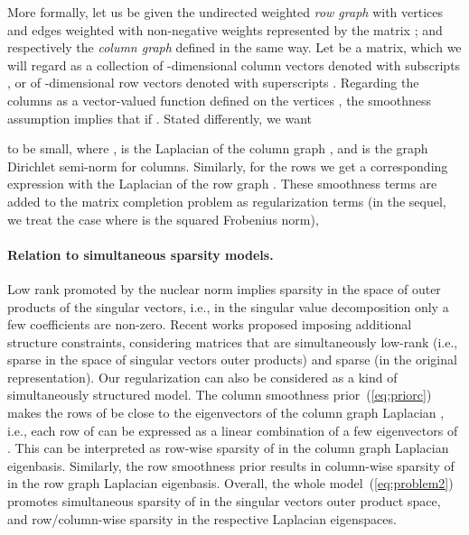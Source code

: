 \documentclass{article}
\begin{document}
More formally, let us be given the undirected weighted {\em row graph}  with vertices  and edges  weighted with non-negative weights represented by the   matrix ; and respectively the {\em column graph}  defined in the same way.  Let  be a matrix, which we will regard as a collection of -dimensional column vectors denoted with subscripts , or of -dimensional row vectors denoted with superscripts . Regarding the columns  as a vector-valued function defined on the vertices , the smoothness assumption implies that  if . Stated differently, we want 
\vspace{-0.15cm}

\vspace{-0.07cm}to be small, where ,  is the Laplacian of the column graph , and  is the graph Dirichlet semi-norm for columns. Similarly, for the rows we get a corresponding expression  with the Laplacian  of the row graph . These smoothness terms are added to the matrix completion problem as regularization terms (in the sequel, we treat the case where  is the squared Frobenius norm), 
\vspace{-0.07cm}

\vspace{-0.55cm}
\paragraph{Relation to simultaneous sparsity models.}
Low rank promoted by the nuclear norm implies sparsity in the space of outer products of the singular vectors, i.e., in the singular value decomposition  only a few coefficients  are non-zero. Recent works \cite{oymak2012simultaneously} proposed imposing additional structure constraints, considering matrices that are simultaneously low-rank (i.e., sparse in the space of singular vectors outer products) and sparse (in the original representation). Our regularization can also be considered as a kind of simultaneously structured model. The column smoothness prior~(\ref{eq:priorc}) makes the rows of  be close to the eigenvectors of the column graph Laplacian , i.e., each row of  can be expressed as a linear combination of a few eigenvectors of . This can be interpreted as row-wise sparsity of  in the column graph Laplacian eigenbasis. 
Similarly, the row smoothness prior results in column-wise sparsity of  in the row graph Laplacian eigenbasis. Overall, the whole model~(\ref{eq:problem2}) promotes simultaneous sparsity of  in the singular vectors outer product space, and row/column-wise sparsity in the respective Laplacian eigenspaces. 
\end{document}
